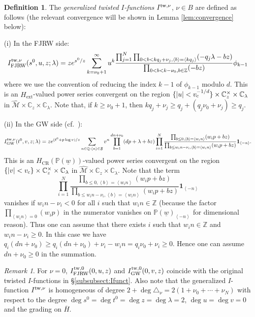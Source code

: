 \documentclass[11pt]{amsart}
\theoremstyle{definition} %
\newtheorem{defn}[thm]{Definition} %
\theoremstyle{remark} %
\newtheorem{rem}[thm]{Remark}%
\newcommand{\CC}{\mathbb C}
\newcommand{\PP}{\mathbb P}
\newcommand{\QQ}{\mathbb Q}
\newcommand{\ZZ}{\mathbb Z}
\newcommand{\tw}{{\rm tw}}
\def\GW{\operatorname{\text{GW}}}
\def\CR{\operatorname{\text{CR}}}
\def\fracp#1{\left\langle #1 \right\rangle}
\newcommand{\cM}{\mathcal{M}}
\newcommand{\hcM}{\widehat{\cM}}
\newcommand{\frF}{\mathfrak{F}}
\newcommand{\unit}{\boldsymbol{1}}
\newcommand{\ext}{{\operatorname{ext}}}
\newcommand{\FJRW}{{\operatorname{FJRW}}}
\renewcommand{\GW}{{\operatorname{GW}}}
\renewcommand{\CR}{{\operatorname{CR}}}
\newcommand{\ov}{\overline}
\newcommand{\vc}{v_{\rm c}}
\newcommand{\uw}{\underline{w}}
\begin{document}
\begin{defn} 
The \emph{generalized twisted $I$-functions} $I^{\tw,\nu}$, 
$\nu \in B$  are defined as follows 
(the relevant convergence will be shown in Lemma \ref{lem:convergence} 
below):  

(i) In the FJRW side:
\[
I^{\tw,\nu}_{\FJRW}(s^0, u, z;\lambda) = 
z e^{s^0/z} 
\sum_{k=\nu_0+1}^{\infty} 
u^k 
\frac{\prod_{j=1}^N 
\prod_{0<b<k q_j + \nu_j, \fracp{b} = \fracp{kq_j}}
(-q_j \lambda - b z) } 
{\prod_{0<b<k-\nu_0 , b\in \ZZ} (-bz)} 
\phi_{k-1}
\]
where 
we use the convention of reducing the index $k-1$ 
of $\phi_{k-1}$ modulo $d$. 
This is an $H_{\ext}$-valued power series convergent 
on the region $\{|u| < \vc^{-1/d}\} \times
\CC_z^\times \times  \CC_\lambda$ in $\hcM \times \CC_z \times 
\CC_\lambda$. 
Note that, if $k\ge \nu_0 +1$, then 
$kq_j + \nu_j \ge q_j + (q_j \nu_0+ \nu_j) \ge q_j$. 

(ii) In the GW side (cf.\ \cite[Definition 4.5]{Iritani:period}): 
\[
I^{\tw,\nu}_{\GW}(t^0,v,z;\lambda) 
= z e^{(t^0 + p \log v)/z} 
\sum_{n \in \QQ:  \fracp{n} \in \frF} 
v^n 
\prod_{b=1}^{d n + \nu_0} (d p + \lambda + bz) 
\prod_{i=1}^N 
\frac{\prod_{b\le 0, \fracp{b} = \fracp{w_i n}} 
(w_i p + bz) }
{\prod_{ b\le w_i n - \nu_i, 
\fracp{b} = \fracp{w_in}}(w_i p + bz) } 
\unit_{\fracp{-n}}. 
\]
This is an $H_{\CR}(\PP(\uw))$-valued power series convergent 
on the region 
$\{|v| < \vc\} \times \CC_z^\times \times \CC_\lambda$ in 
$\hcM \times \CC_z \times \CC_\lambda$. 
Note that the term 
\[
\prod_{i=1}^N 
\frac{\prod_{b\le 0, \fracp{b} = \fracp{w_i n}} 
(w_i p + bz) }
{\prod_{ b\le w_i n - \nu_i, 
\fracp{b} = \fracp{w_in}}(w_i p + bz) } 
\unit_{\fracp{-n}} 
\]
vanishes if $w_i n - \nu_i <0$ for all $i$ such that 
$w_i n\in \ZZ$ (because the factor 
$\prod_{\fracp{w_i n} =0} (w_i p)$ in the numerator 
vanishes on $\PP(\uw)_{\fracp{-n}}$ for 
dimensional reason). 
Thus one can assume that there exists 
$i$ such that $w_i n \in \ZZ$ and $w_i n - \nu_i\ge 0$. 
In this case we have $q_i(d n+ \nu_0)  
\ge q_i (d n + \nu_0) + \nu_i - w_i n 
= q_i \nu_0 + \nu_i \ge 0$. 
Hence one can assume $d n + \nu_0 \ge 0$ in the 
summation. 
\end{defn}

\begin{rem} 
For $\nu=0$, $I^{\tw,0}_{\FJRW}(0,u,z)$ and 
$I^{\tw,0}_{\GW}(0,v,z)$ coincide with the original 
twisted $I$-functions in \S \ref{subsubsect:Ifunct}. 
Also note that the generalized $I$-function $I^{\tw, \nu}$ is  
homogeneous of degree $2 + \deg \triangle_{\nu}= 2(1+ \nu_0+\cdots+\nu_N)$ 
with respect to the degree $\deg s^0 = \deg t^0 
= \deg z =\deg \lambda= 2$, $\deg u = \deg v = 0$ and the grading 
on $\ov{H}$. 
\end{rem} 
\end{document}
